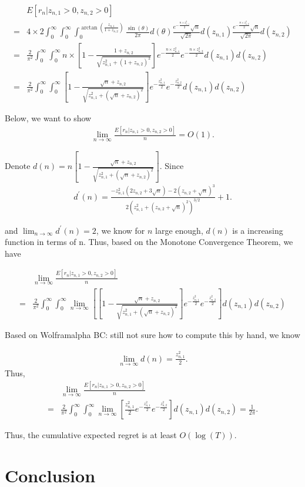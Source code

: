 \documentclass{article}
\newcommand{\bccomment}[1]{{\color{blue}BC: #1}}
\begin{document}
\begin{align}
&E[r_n| z_{n,1}>0, z_{n,2}>0] \nonumber \\
=& 4\times 2 \int_{0}^{\infty} \int_{0}^{\infty} \int_{0}^{\arctan(\frac{z_{n,1}}{1+z_{n,2}})}\frac{\sin(\theta)}{2\pi}d(\theta)\frac{e^{-\frac{n \times z_{n,1}^2}{2}}\sqrt{n}}{\sqrt{2\pi}}d(z_{n,1})\frac{e^{-\frac{n \times z_{n,2}^2}{2}}\sqrt{n}}{\sqrt{2\pi}}d(z_{n,2}) \nonumber \\
=& \frac{2}{\pi^2}\int_{0}^{\infty} \int_{0}^{\infty}n\times [1-\frac{1+z_{n,2}}{\sqrt{z_{n,1}^2+(1+z_{n,2})^2}}]e^{-\frac{n \times z_{n,1}^2}{2}}e^{-\frac{n \times z_{n,2}^2}{2}}d(z_{n,1})d(z_{n,2}) \nonumber \\
=& \frac{2}{\pi^2}\int_{0}^{\infty} \int_{0}^{\infty} \left[1-\frac{\sqrt{n}+z_{n,2}}{\sqrt{z_{n,1}^2+(\sqrt{n}+z_{n,2})^2}}\right]e^{-\frac{z_{n,1}^2}{2}}e^{-\frac{z_{n,2}^2}{2}}d(z_{n,1})d(z_{n,2}) \nonumber 
\end{align}

Below, we want to show 
\begin{align}
\lim_{n\rightarrow\infty}\frac{E[r_n| z_{n,1}>0, z_{n,2}>0]}{n} = O(1). \nonumber
\end{align}

Denote $d(n)=n\left[1-\frac{\sqrt{n}+z_{n,2}}{\sqrt{z_{n,1}^2+(\sqrt{n}+z_{n,2})^2}}\right]$.
Since
\begin{align}
d^{'}(n)=\frac{-z_{n,1}^2(2z_{n,2}+3\sqrt{n})-2(z_{n,2}+\sqrt{n})^3}{2(z_{n,1}^2+(z_{n,2}+\sqrt{n})^2)^{3/2}}+1. \nonumber
\end{align}

and $\lim_{n\rightarrow \infty}d^{'}(n)=2$, we know for $n$ large enough, $d(n)$ is a increasing function in terms of n. Thus, based on the Monotone Convergence Theorem, we have

\begin{align}
&\lim_{n\rightarrow \infty}\frac{E[r_n| z_{n,1}>0, z_{n,2}>0]}{n} \nonumber \\
=& \frac{2}{\pi^2}\int_{0}^{\infty} \int_{0}^{\infty}\lim_{n\rightarrow \infty}\left[ \left[1-\frac{\sqrt{n}+z_{n,2}}{\sqrt{z_{n,1}^2+(\sqrt{n}+z_{n,2})^2}}\right]e^{-\frac{z_{n,1}^2}{2}}e^{-\frac{z_{n,2}^2}{2}}\right]d(z_{n,1})d(z_{n,2}) \nonumber  
\end{align}


Based on Wolframalpha \bccomment{still not sure how to compute this by hand}, we know

\begin{align}
\lim_{n\rightarrow \infty} d(n)=\frac{z_{n,1}^2}{2}. \nonumber
\end{align}
Thus,
\begin{align}
&\lim_{n\rightarrow \infty}\frac{E[r_n| z_{n,1}>0, z_{n,2}>0]}{n} \nonumber \\
=&\frac{2}{\pi^2}\int_{0}^{\infty} \int_{0}^{\infty}\lim_{n\rightarrow \infty}\left[ \frac{z_{n,1}^2}{2}e^{-\frac{z_{n,1}^2}{2}}e^{-\frac{z_{n,2}^2}{2}}\right]d(z_{n,1})d(z_{n,2}) = \frac{1}{2\pi}. \nonumber
\end{align}


Thus, the cumulative expected regret is at least $O(\log(T))$.


\section{Conclusion}


{}

\end{document}
